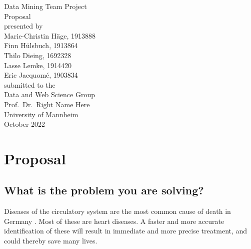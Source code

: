 \documentclass[11pt,titlepage,oneside,openany]{book}
\begin{document}
\begin{titlepage}
	\vspace*{2cm}
  \begin{center}
   {\Large Data Mining Team Project\\}
   \vspace{2cm} 
   {Proposal\\}
   \vspace{2cm}
   {presented by\\
    Marie-Christin Häge, 1913888 \\
    Finn Hülsbuch, 1913864 \\
    Thilo Dieing, 1692328 \\
    Lasse Lemke, 1914420 \\
    Eric Jacquomé, 1903834 \\
   }
   \vspace{1cm} 
   {submitted to the\\
    Data and Web Science Group\\
    Prof.\ Dr.\ Right Name Here\\
    University of Mannheim\\} \vspace{2cm}
   {October 2022}
  \end{center}
\end{titlepage} 






\newpage



\chapter{Proposal}
\section{What is the problem you are solving?}
\label{sec:problem}

Diseases of the circulatory system are the most common cause of death in Germany \cite{statistischesbundesamt2022}. 
Most of these are heart diseases. A faster and more accurate identification of these will result in immediate and more precise treatment, and could thereby save many lives.
\end{document}
